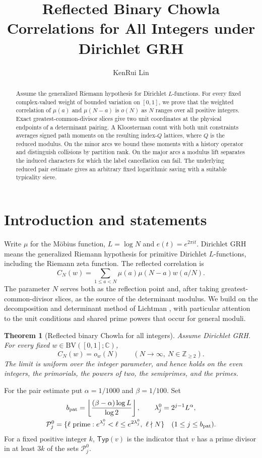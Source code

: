 \documentclass[11pt]{amsart}
\title[Reflected binary Chowla correlations under Dirichlet GRH]{Reflected Binary Chowla Correlations for All Integers under Dirichlet GRH}
\author{KenRui Lin}
\numberwithin{equation}{section}
\newtheorem{theorem}{Theorem}[section]
\theoremstyle{remark}
\newcommand{\Z}{\mathbb Z}
\newcommand{\C}{\mathbb C}
\newcommand{\Typ}{\mathsf{Typ}}
\newcommand{\BV}{\mathrm{BV}}
\begin{document}
\begin{abstract}
Assume the generalized Riemann hypothesis for Dirichlet $L$-functions. For every fixed complex-valued weight of bounded variation on $[0,1]$, we prove that the weighted correlation of $\mu(a)$ and $\mu(N-a)$ is $o(N)$ as $N$ ranges over all positive integers. Exact greatest-common-divisor slices give two unit coordinates at the physical endpoints of a determinant pairing. A Kloosterman count with both unit constraints averages signed path moments on the resulting index-$Q$ lattices, where $Q$ is the reduced modulus. On the minor arcs we bound these moments with a history operator and distinguish collisions by partition rank. On the major arcs a modulus lift separates the induced characters for which the label cancellation can fail. The underlying reduced pair estimate gives an arbitrary fixed logarithmic saving with a suitable typicality sieve.
\end{abstract}
\maketitle

\section{Introduction and statements}

Write $\mu$ for the M\"obius function, $L=\log N$ and $e(t)=e^{2\pi i t}$. Dirichlet GRH means the generalized Riemann hypothesis for primitive Dirichlet $L$-functions, including the Riemann zeta function. The reflected correlation is
\[
 C_N(w)=\sum_{1\le a<N}\mu(a)\mu(N-a)w(a/N).
\]
The parameter $N$ serves both as the reflection point and, after taking greatest-common-divisor slices, as the source of the determinant modulus. We build on the decomposition and determinant method of Lichtman \cite{Lichtman}, with particular attention to the unit conditions and shared prime powers that occur for general moduli.

\begin{theorem}[Reflected binary Chowla for all integers]\label{thm:main}
Assume Dirichlet GRH. For every fixed $w\in \BV([0,1];\C)$,
\[
 C_N(w)=o_w(N)\qquad(N\longrightarrow\infty,\ N\in\Z_{\ge2}).
\]
The limit is uniform over the integer parameter, and hence holds on the even integers, the primorials, the powers of two, the semiprimes, and the primes.
\end{theorem}

For the pair estimate put $\alpha=1/1000$ and $\beta=1/100$. Set
\[
 \begin{gathered}
 b_{\rm pat}=\left\lfloor\frac{(\beta-\alpha)\log L}{\log 2}\right\rfloor,
 \qquad \lambda_j^0=2^{j-1}L^\alpha,\\
 \mathcal P_j^0=\{\ell\text{ prime}:e^{\lambda_j^0}<\ell\le e^{2\lambda_j^0},\ \ell\nmid N\}
 \quad(1\le j\le b_{\rm pat}).
 \end{gathered}
\]
For a fixed positive integer $k$, $\Typ(v)$ is the indicator that $v$ has a prime divisor in at least $3k$ of the sets $\mathcal P_j^0$.
\end{document}
